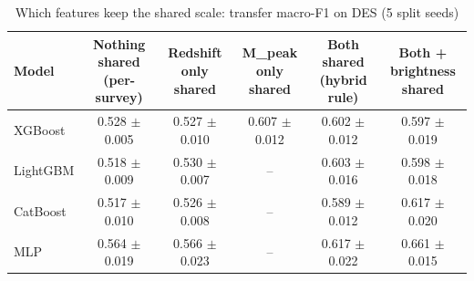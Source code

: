 \begin{table}
\centering
\caption{Which features keep the shared scale: transfer macro-F1 on DES (5 split seeds)}
\begin{tabular}{lccccc}
\hline
Model & Nothing shared (per-survey) & Redshift only shared & M\_peak only shared & Both shared (hybrid rule) & Both + brightness shared \\
\hline
XGBoost & 0.528 $\pm$ 0.005 & 0.527 $\pm$ 0.010 & 0.607 $\pm$ 0.012 & 0.602 $\pm$ 0.012 & 0.597 $\pm$ 0.019 \\
LightGBM & 0.518 $\pm$ 0.009 & 0.530 $\pm$ 0.007 & -- & 0.603 $\pm$ 0.016 & 0.598 $\pm$ 0.018 \\
CatBoost & 0.517 $\pm$ 0.010 & 0.526 $\pm$ 0.008 & -- & 0.589 $\pm$ 0.012 & 0.617 $\pm$ 0.020 \\
MLP & 0.564 $\pm$ 0.019 & 0.566 $\pm$ 0.023 & -- & 0.617 $\pm$ 0.022 & 0.661 $\pm$ 0.015 \\
\hline
\end{tabular}
\end{table}
